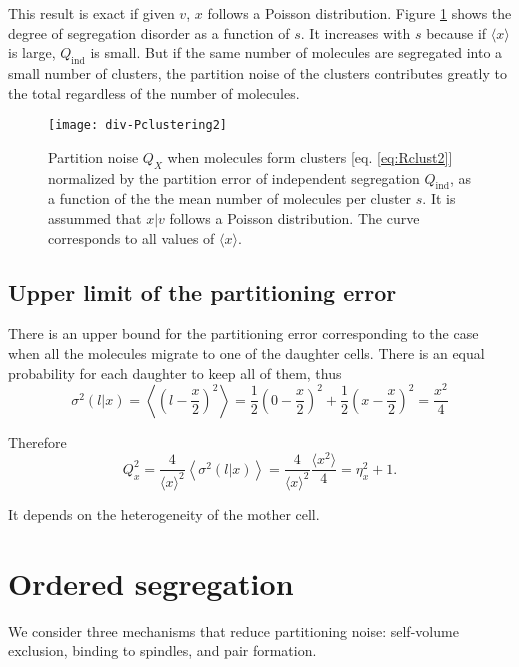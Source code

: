 This result is exact if given $v$, $x$ follows a Poisson distribution. Figure \ref{fig:div-Pclustering2} shows the degree of segregation disorder as a function of $s$. It increases with $s$ because if $\langle x\rangle$ is large, $Q_\text{ind}$ is small. But if the same number of molecules are segregated into a small number of clusters, the partition noise of the clusters contributes greatly to the total regardless of the number of molecules.
\begin{figure}[H]
  \centering
  \texttt{[image: div-Pclustering2]}
  \caption[Partition noise when molecules form clusters as a function of the number of molecules per cluster]{\label{fig:div-Pclustering2}Partition noise $Q_X$ when molecules form clusters [eq. \eqref{eq:Rclust2}] normalized by the partition error of independent segregation $Q_\text{ind}$, as a function of the the mean number of molecules per cluster $s$. It is assummed that $x|v$ follows a Poisson distribution. The curve corresponds to all values of $\langle x\rangle$.}
\end{figure}

\subsection{Upper limit of the partitioning error}

There is an upper bound for the partitioning error corresponding to the case when all the molecules migrate to one of the daughter cells. There is an equal probability for each daughter to keep all of them, thus
\begin{equation*}
  \sigma^2(l|x) = \left\langle\left(l-\frac{x}{2}\right)^2\right\rangle = \frac{1}{2}\left(0-\frac{x}{2}\right)^2+\frac{1}{2}\left(x-\frac{x}{2}\right)^2 = \frac{x^2}{4}
\end{equation*}

Therefore
\begin{equation*}
  Q_x^2 = \frac{4}{\langle x\rangle^2}\left\langle\sigma^2(l|x)\right\rangle = \frac{4}{\langle x\rangle^2}\frac{\langle x^2\rangle}{4} = \eta_x^2+1.
\end{equation*}

It depends on the heterogeneity of the mother cell.

\section{Ordered segregation}

We consider three mechanisms that reduce partitioning noise: self-volume exclusion, binding to spindles, and pair formation.

